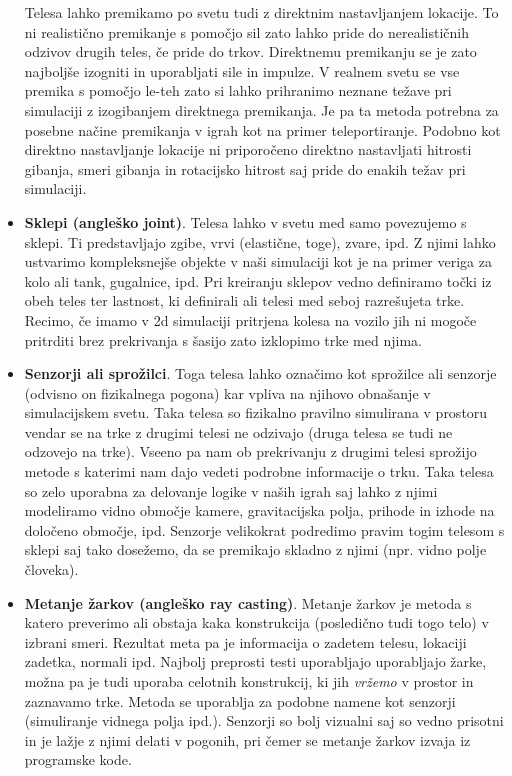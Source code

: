 \documentclass[12pt,a4paper,twoside]{book}
\begin{document}
\begin{itemize}
	Telesa lahko premikamo po svetu tudi z direktnim nastavljanjem lokacije. To ni realistično premikanje s pomočjo sil zato lahko pride do nerealističnih odzivov drugih teles, če pride do trkov. Direktnemu premikanju se je zato najboljše izogniti in uporabljati sile in impulze. V realnem svetu se vse premika s pomočjo le-teh zato si lahko prihranimo neznane težave pri simulaciji z izogibanjem direktnega premikanja. Je pa ta metoda potrebna za posebne načine premikanja v igrah kot na primer teleportiranje. Podobno kot direktno nastavljanje lokacije ni priporočeno direktno nastavljati hitrosti gibanja, smeri gibanja in rotacijsko hitrost saj pride do enakih težav pri simulaciji.
	\item \textbf{Sklepi (angleško joint)}. Telesa lahko v svetu med samo povezujemo s sklepi. Ti predstavljajo zgibe, vrvi (elastične, toge), zvare, ipd. Z njimi lahko ustvarimo kompleksnejše objekte v naši simulaciji kot je na primer veriga za kolo ali tank, gugalnice, ipd.  Pri kreiranju sklepov vedno definiramo točki iz obeh teles ter lastnost, ki definirali ali telesi med seboj razrešujeta trke. Recimo, če imamo v 2d simulaciji pritrjena kolesa na vozilo jih ni mogoče pritrditi brez prekrivanja s šasijo zato izklopimo trke med njima.
	\item \textbf{Senzorji ali sprožilci}. Toga telesa lahko označimo kot sprožilce ali senzorje (odvisno on fizikalnega pogona) kar vpliva na njihovo obnašanje v simulacijskem svetu. Taka telesa so fizikalno pravilno simulirana v prostoru vendar se na trke z drugimi telesi ne odzivajo (druga telesa se tudi ne odzovejo na trke). Vseeno pa nam ob prekrivanju z drugimi telesi sprožijo metode s katerimi nam dajo vedeti podrobne informacije o trku. Taka telesa so zelo uporabna za delovanje logike v naših igrah saj lahko z njimi modeliramo vidno območje kamere, gravitacijska polja, prihode in izhode na določeno območje, ipd. Senzorje velikokrat podredimo pravim togim telesom s sklepi saj tako dosežemo, da se premikajo skladno z njimi (npr. vidno polje človeka).
	\item \textbf{Metanje žarkov (angleško ray casting)}. Metanje žarkov je metoda s katero preverimo ali obstaja kaka konstrukcija (posledično tudi togo telo) v izbrani smeri. Rezultat meta pa je informacija o zadetem telesu, lokaciji zadetka, normali ipd. Najbolj preprosti testi uporabljajo uporabljajo žarke, možna pa je tudi uporaba celotnih konstrukcij, ki jih \textit{vržemo} v prostor in zaznavamo trke. Metoda se uporablja za podobne namene kot senzorji (simuliranje vidnega polja ipd.). Senzorji so bolj vizualni saj so vedno prisotni in je lažje z njimi delati v pogonih, pri čemer se metanje žarkov izvaja iz programske kode.
\end{itemize}
\end{document}
